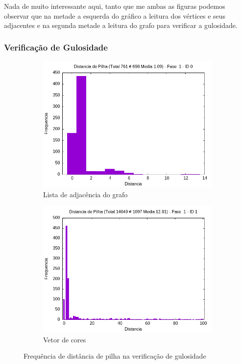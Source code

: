 \documentclass{article}
\begin{document}
Nada de muito interessante aqui, tanto que me ambas as figuras podemos observar que na metade a esquerda do gráfico a leitura dos vértices e seus adjacentes e na segunda metade a leitura do grafo para verificar a gulosidade.
        
\subsubsection{Verificação de Gulosidade}

\begin{figure}[H]
    \centering
    \hfill
    \begin{subfigure}[c]{0.4\textwidth}
        \centering
        \includegraphics[width=\textwidth]{./images/100-200/common/registro_a-hist-1-0.png}
        \caption{Lista de adjacência do grafo}
        \label{fig:ac03}
    \end{subfigure}
    \hfill
    \begin{subfigure}[c]{0.4\textwidth}
        \centering
        \includegraphics[width=\textwidth]{./images/100-200/common/registro_a-hist-1-1.png}
        \caption{Vetor de cores}
        \label{fig:ac04}
    \end{subfigure}
    \hfill
    \caption{Frequência de distância de pilha na verificação de gulosidade}

\end{figure}
\end{document}
